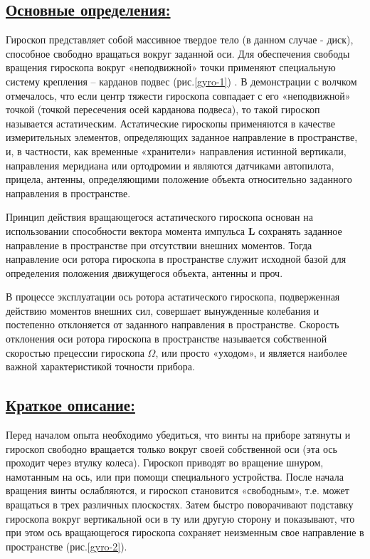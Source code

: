 \documentclass[14pt,a4paper,oneside]{extarticle}	%
\begin{document}
	\newpage	
		\subsection*{\underline{Основные определения:}}
		
		Гироскоп представляет собой массивное твердое тело (в данном случае - диск), способное свободно вращаться вокруг заданной оси. 
		Для обеспечения свободы вращения гироскопа вокруг «неподвижной» точки применяют специальную систему крепления -- карданов подвес (рис.\ref{gyro-1}) .
		В демонстрации с волчком отмечалось, что если центр тяжести гироскопа совпадает с его «неподвижной» точкой (точкой пересечения осей карданова подвеса), то такой гироскоп называется астатическим.
		Астатические гироскопы применяются в качестве измерительных элементов, определяющих заданное направление в пространстве, и, в частности, как временные «хранители» направления истинной вертикали, направления меридиана или ортодромии и являются датчиками автопилота, прицела, антенны, определяющими положение объекта относительно заданного направления в пространстве.
		
		Принцип действия вращающегося астатического гироскопа основан на использовании способности вектора момента импульса \textbf{L} сохранять заданное направление в пространстве при отсутствии внешних моментов.
		Тогда направление оси ротора гироскопа в пространстве служит исходной базой для определения положения движущегося объекта, антенны и проч.
		
		В процессе эксплуатации ось ротора астатического гироскопа, подверженная действию моментов внешних сил, совершает вынужденные колебания и постепенно отклоняется от заданного направления в пространстве.		
		Скорость отклонения оси ротора гироскопа в пространстве называется собственной скоростью прецессии гироскопа $ \Omega $, или просто «уходом», и является наиболее важной характеристикой точности прибора.

	\newpage
	\subsection*{\underline{Краткое описание:}}
	
	Перед началом опыта необходимо убедиться, что винты на приборе затянуты и гироскоп свободно вращается только вокруг своей собственной оси (эта ось проходит через втулку колеса).
	Гироскоп приводят во вращение шнуром, намотанным на ось, или при помощи специального устройства.
	После начала вращения винты ослабляются, и гироскоп становится «свободным», т.е. может вращаться в трех различных плоскостях.
	Затем быстро поворачивают подставку гироскопа вокруг вертикальной оси в ту или другую сторону и показывают, что при этом ось вращающегося гироскопа сохраняет неизменным свое направление в пространстве (рис.\ref{gyro-2}).
	
\end{document}
